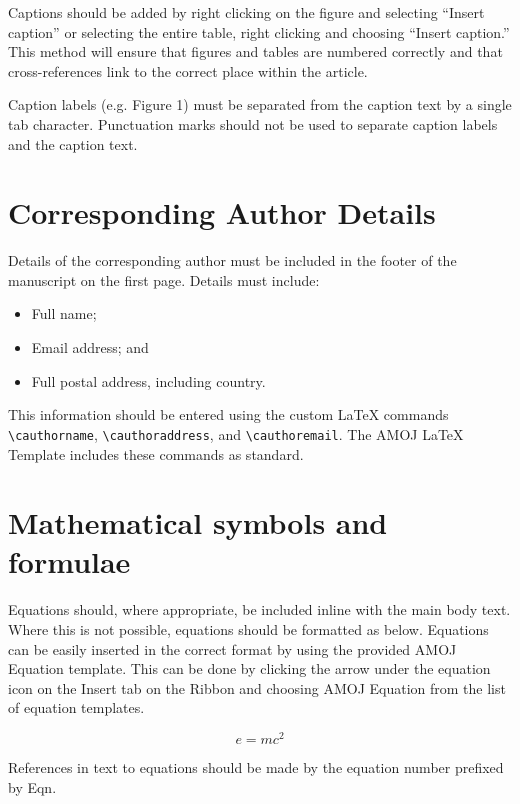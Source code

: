 \documentclass[10pt]{article}
\begin{document}
Captions should be added by right clicking on the figure and selecting “Insert caption” or selecting the entire table, right clicking and choosing “Insert caption.” This method will ensure that figures and tables are numbered correctly and that cross-references link to the correct place within the article.

Caption labels (e.g. Figure 1) must be separated from the caption text by a single tab character. Punctuation marks should not be used to separate caption labels and the caption text.

\section{Corresponding Author Details}
\label{CorrespondingAuthorDetails}
Details of the corresponding author must be included in the footer of the manuscript on the first page. Details must include:

\begin{itemize}
  \item Full name;
  \item Email address; and
  \item Full postal address, including country.
\end{itemize}

This information should be entered using the custom LaTeX commands \verb|\cauthorname|, \verb|\cauthoraddress|, and \verb|\cauthoremail|. The AMOJ LaTeX Template includes these commands as standard.

\section{Mathematical symbols and formulae}
\label{MathematicalSymbolsFormualae}
Equations should, where appropriate, be included inline with the main body text. Where this is not possible, equations should be formatted as below. Equations can be easily inserted in the correct format by using the provided AMOJ Equation template. This can be done by clicking the arrow under the equation icon on the Insert tab on the Ribbon and choosing AMOJ Equation from the list of equation templates.

\begin{equation}
e = mc^2
\end{equation}

References in text to equations should be made by the equation number prefixed by Eqn.
\end{document}
